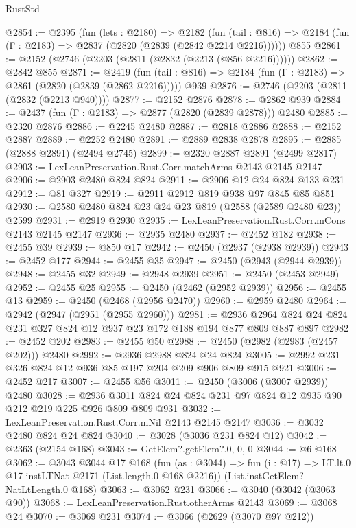 \begin{lexlean}{RustStd}
\begin{coremodule}
@2854 := @2395
    (fun (lets : @2180) =>
    @2182
      (fun (tail : @816) => @2184 (fun (Γ : @2183) => @2837 (@2820 (@2839 (@2842 @2214 @2216))))))
    @855
@2861 := @2152 (@2746 (@2203 (@2811 (@2832 (@2213 (@856 @2216))))))
@2862 := @2842 @855
@2871 := @2419
    (fun (tail : @816) => @2184 (fun (Γ : @2183) => @2861 (@2820 (@2839 (@2862 @2216)))))
    @939
@2876 := @2746 (@2203 (@2811 (@2832 (@2213 @940))))
@2877 := @2152 @2876
@2878 := @2862 @939
@2884 := @2437 (fun (Γ : @2183) => @2877 (@2820 (@2839 @2878))) @2480
@2885 := @2320 @2876
@2886 := @2245 @2480
@2887 := @2818 @2886
@2888 := @2152 @2887
@2889 := @2252 @2480
@2891 := @2889 @2838 @2878
@2895 := @2885 (@2888 @2891) (@2494 @2745)
@2899 := @2320 @2887 @2891 (@2499 @2817)
@2903 := LexLeanPreservation.Rust.Corr.matchArms @2143 @2145 @2147
@2906 := @2903 @2480 @824 @824
@2911 := @2906 @12 @24 @824 @133 @231
@2912 := @81 @327
@2919 := @2911 @2912 @819 @938 @97 @845 @85 @851
@2930 := @2580 @2480 @824 @23 @24 @23 @819 (@2588 (@2589 @2480 @23)) @2599
@2931 := @2919 @2930
@2935 := LexLeanPreservation.Rust.Corr.mCons @2143 @2145 @2147
@2936 := @2935 @2480
@2937 := @2452 @182
@2938 := @2455 @39
@2939 := @850 @17
@2942 := @2450 (@2937 (@2938 @2939))
@2943 := @2452 @177
@2944 := @2455 @35
@2947 := @2450 (@2943 (@2944 @2939))
@2948 := @2455 @32
@2949 := @2948 @2939
@2951 := @2450 (@2453 @2949)
@2952 := @2455 @25
@2955 := @2450 (@2462 (@2952 @2939))
@2956 := @2455 @13
@2959 := @2450 (@2468 (@2956 @2470))
@2960 := @2959 @2480
@2964 := @2942 (@2947 (@2951 (@2955 @2960)))
@2981 := @2936 @2964 @824 @24 @824 @231 @327 @824 @12 @937 @23 @172 @188 @194 @877 @809 @887 @897
@2982 := @2452 @202
@2983 := @2455 @50
@2988 := @2450 (@2982 (@2983 (@2457 @202))) @2480
@2992 := @2936 @2988 @824 @24 @824
@3005 := @2992 @231 @326 @824 @12 @936 @85 @197 @204 @209 @906 @809 @915 @921
@3006 := @2452 @217
@3007 := @2455 @56
@3011 := @2450 (@3006 (@3007 @2939)) @2480
@3028 := @2936 @3011 @824 @24 @824 @231 @97 @824 @12 @935 @90 @212 @219 @225 @926 @809 @809 @931
@3032 := LexLeanPreservation.Rust.Corr.mNil @2143 @2145 @2147
@3036 := @3032 @2480 @824 @24 @824
@3040 := @3028 (@3036 @231 @824 @12)
@3042 := @2363 (@2154 @168)
@3043 := GetElem?.getElem?.{0, 0, 0}
@3044 := @6 @168
@3062 := @3043
    @3044
    @17
    @168
    (fun (as : @3044) =>
    fun (i : @17) => LT.lt.{0} @17 instLTNat @2171 (List.length.{0} @168 @2216))
    (List.instGetElem?NatLtLength.{0} @168)
@3063 := @3062 @231
@3066 := @3040 (@3042 (@3063 @90))
@3068 := LexLeanPreservation.Rust.otherArms @2143
@3069 := @3068 @24
@3070 := @3069 @231
@3074 := @3066 (@2629 (@3070 @97 @212))

\end{coremodule}
\end{lexlean}
